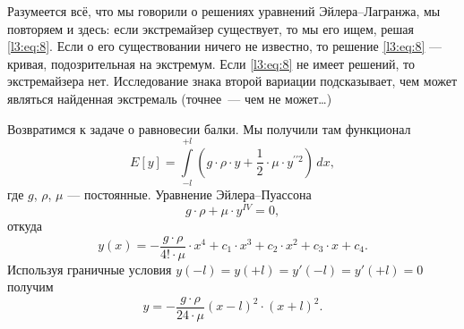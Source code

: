 Разумеется всё, что мы говорили о решениях уравнений Эйлера--Лагранжа, мы повторяем и здесь: если экстремайзер существует, то мы его ищем, решая \eqref{l3:eq:8}. Если о его существовании ничего не известно, то решение \eqref{l3:eq:8} --- кривая, подозрительная на экстремум. Если \eqref{l3:eq:8} не имеет решений, то экстремайзера нет. Исследование знака второй вариации подсказывает, чем может являться найденная экстремаль (точнее~--- чем не может\dots)

Возвратимся к задаче о равновесии балки. Мы получили там функционал 
\begin{equation*}
	 E[y]=\int\limits_{-l}^{+l}\left(g\cdot\rho\cdot y+\frac12\cdot\mu\cdot y^{\prime\prime2}\right)\,dx,
\end{equation*}
где $g$, $\rho$, $\mu$ --- постоянные.
Уравнение Эйлера--Пуассона 
\begin{equation*}
	 g\cdot\rho+\mu\cdot y^{IV}=0,
\end{equation*}
откуда
\begin{equation*}
	 y(x)=-\frac{g\cdot\rho}{4!\cdot\mu}\cdot x^4+c_1\cdot x^3+c_2\cdot x^2+c_3\cdot x+c_4.
\end{equation*}
Используя граничные условия $y(-l)=y(+l)=y'(-l)=y'(+l)=0$ получим
\begin{equation*}
	 y=-\frac{g\cdot\rho}{24\cdot\mu}(x-l)^2\cdot(x+l)^2.
\end{equation*} 

